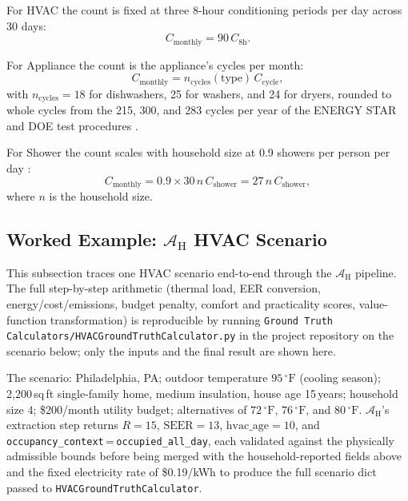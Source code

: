 \documentclass[11pt]{article}
\begin{document}
For HVAC the count is fixed at three 8-hour conditioning periods per day across 30 days:
\begin{equation}
C_{\mathrm{monthly}} = 90\,C_{\mathrm{8h}}.
\end{equation}

For Appliance the count is the appliance's cycles per month:
\begin{equation}
C_{\mathrm{monthly}} = n_{\mathrm{cycles}}(\text{type})\,C_{\mathrm{cycle}},
\end{equation}
with $n_{\mathrm{cycles}} = 18$ for dishwashers, 25 for washers, and 24 for dryers, rounded to whole cycles from the 215, 300, and 283 cycles per year of the ENERGY STAR and DOE test procedures \citep{energystar_dishwasher_criteria2023,energystar_clotheswasher,doe_dryer_tp_2011}.

For Shower the count scales with household size at 0.9 showers per person per day \citep{reu2016}:
\begin{equation}
C_{\mathrm{monthly}} = 0.9 \times 30\,n\,C_{\mathrm{shower}} = 27\,n\,C_{\mathrm{shower}},
\end{equation}
where $n$ is the household size.

\subsection{Worked Example: \texorpdfstring{$\mathcal{A}_{\text{H}}$}{A_H} HVAC Scenario}
\label{app:hvac_worked}

This subsection traces one HVAC scenario end-to-end through the
$\mathcal{A}_{\text{H}}$ pipeline. The full step-by-step arithmetic
(thermal load, EER conversion, energy/cost/emissions, budget penalty,
comfort and practicality scores, value-function transformation) is
reproducible by running \texttt{Ground Truth Calculators/HVACGroundTruthCalculator.py}
in the project repository on the scenario below; only the inputs and the
final result are shown here.

The scenario: Philadelphia, PA; outdoor temperature $95\,^\circ\text{F}$
(cooling season); 2{,}200\,sq\,ft single-family home, medium insulation,
house age 15\,years; household size 4; \$200/month utility budget;
alternatives of $72\,^\circ\text{F}$, $76\,^\circ\text{F}$, and
$80\,^\circ\text{F}$. $\mathcal{A}_{\text{H}}$'s extraction step returns
$R=15$, $\text{SEER}=13$, $\text{hvac\_age}=10$, and
\texttt{occupancy\_context}\,=\,\texttt{occupied\_all\_day}, each validated
against the physically admissible bounds
before being merged with the household-reported fields above and the fixed
electricity rate of \$0.19/kWh to produce the full scenario dict passed to
\texttt{HVACGroundTruthCalculator}.
\end{document}
